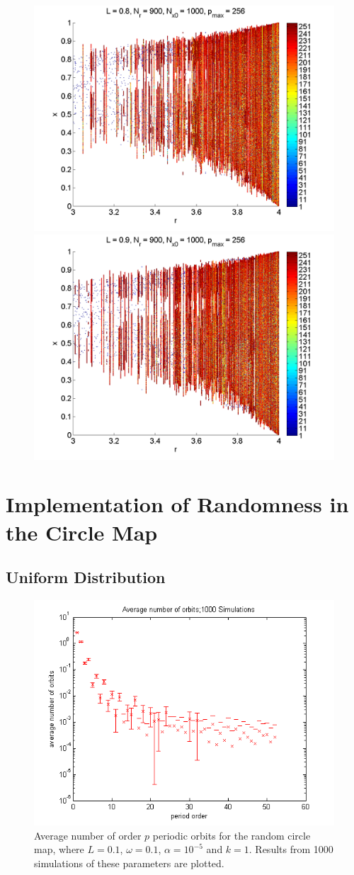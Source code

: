 \begin{figure}[H]
\begin{center}
		\includegraphics[width=.5\textwidth]{figs/rlog_bif_zoom_L_08.png}\hfill
		\includegraphics[width=.5\textwidth]{figs/rlog_bif_zoom_L_09.png}\\
	\end{center}
\end{figure}

\section{Implementation of Randomness in the Circle Map}
\subsection{Uniform Distribution}
\begin{figure}[H]\linespread{1}
\caption[Average number of order $p$ orbits for the random circle
map]{Average number of order $p$ periodic orbits for the random circle
map, where $L=0.1$, $\omega =0.1$, $\alpha = 10^{-5}$ and $k=1$. Results from 1000
simulations of these parameters are plotted.}
	\begin{center}
		\includegraphics[scale=0.7]{figs/rcirc_avg_num_1000_sim_logscale.png}
	\end{center}
\end{figure}

